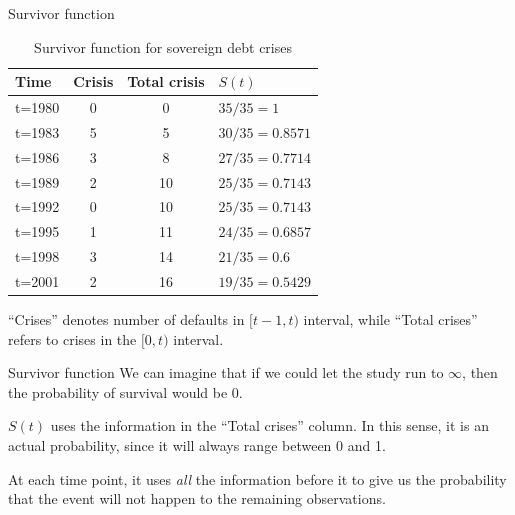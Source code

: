 \documentclass[12pt,english,pdf,xcolor=dvipsnames,aspectratio=169]{beamer}\usepackage[]{graphicx}\usepackage[]{xcolor}
\begin{document}
\begin{frame}{Survivor function}

\begin{table}
\centering
\begin{tabular}{l c c l}
\toprule
Time & Crisis & Total crisis & $S(t)$ \\
\midrule
t=1980 & 0 & 0 & $35/35=1$ \\
t=1983 & 5 & 5 & $30/35=0.8571$ \\
t=1986 & 3 & 8 & $27/35=0.7714$ \\
t=1989 & 2 & 10 & $25/35=0.7143$ \\
t=1992 & 0 & 10 & $25/35=0.7143$ \\
t=1995 & 1 & 11 & $24/35=0.6857$ \\
t=1998 & 3 & 14 & $21/35=0.6$ \\
t=2001 & 2 & 16 & $19/35=0.5429$ \\
\bottomrule
\end{tabular}
\caption*{Survivor function for sovereign debt crises}
\end{table}

``Crises'' denotes number of defaults in $[t-1,t)$ interval, while ``Total crises'' refers to crises in the $[0,t)$ interval.
\end{frame}



\begin{frame}{Survivor function}
We can imagine that if we could let the study run to $\infty$, then the probability of survival would be 0.\bigskip

$S(t)$ uses the information in the ``Total crises'' column. In this sense, it is an actual probability, since it will always range between 0 and 1.\bigskip

At each time point, it uses \textit{all} the information before it to give us the probability that the event will not happen to the remaining observations.
\end{frame}
\end{document}
